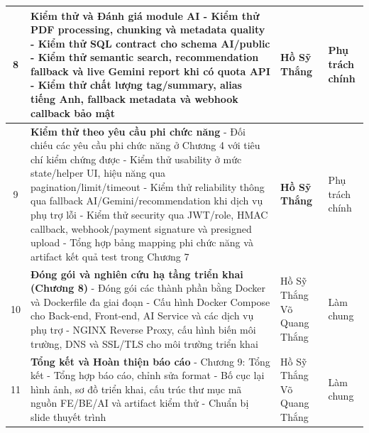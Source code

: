 \begin{center}
\begin{longtable}{|c|p{8.1cm}|p{2.8cm}|p{2.4cm}|}
8 & \textbf{Kiểm thử và Đánh giá module AI} \newline
- Kiểm thử PDF processing, chunking và metadata quality \newline
- Kiểm thử SQL contract cho schema AI/public \newline
- Kiểm thử semantic search, recommendation fallback và live Gemini report khi có quota API \newline
- Kiểm thử chất lượng tag/summary, alias tiếng Anh, fallback metadata và webhook callback bảo mật
& \textbf{Hồ Sỹ Thắng} & Phụ trách chính \\
\hline

9 & \textbf{Kiểm thử theo yêu cầu phi chức năng} \newline
- Đối chiếu các yêu cầu phi chức năng ở Chương 4 với tiêu chí kiểm chứng được \newline
- Kiểm thử usability ở mức state/helper UI, hiệu năng qua pagination/limit/timeout \newline
- Kiểm thử reliability thông qua fallback AI/Gemini/recommendation khi dịch vụ phụ trợ lỗi \newline
- Kiểm thử security qua JWT/role, HMAC callback, webhook/payment signature và presigned upload \newline
- Tổng hợp bảng mapping phi chức năng và artifact kết quả test trong Chương 7
& \textbf{Hồ Sỹ Thắng} & Phụ trách chính \\
\hline

10 & \textbf{Đóng gói và nghiên cứu hạ tầng triển khai (Chương 8)} \newline
- Đóng gói các thành phần bằng Docker và Dockerfile đa giai đoạn \newline
- Cấu hình Docker Compose cho Back-end, Front-end, AI Service và các dịch vụ phụ trợ \newline
- NGINX Reverse Proxy, cấu hình biến môi trường, DNS và SSL/TLS cho môi trường triển khai
& Hồ Sỹ Thắng \newline Võ Quang Thắng & Làm chung \\
\hline

11 & \textbf{Tổng kết và Hoàn thiện báo cáo} \newline
- Chương 9: Tổng kết \newline
- Tổng hợp báo cáo, chỉnh sửa format \newline
- Bố cục lại hình ảnh, sơ đồ triển khai, cấu trúc thư mục mã nguồn FE/BE/AI và artifact kiểm thử \newline
- Chuẩn bị slide thuyết trình
& Hồ Sỹ Thắng \newline Võ Quang Thắng & Làm chung \\
\hline

\end{longtable}
\end{center}
